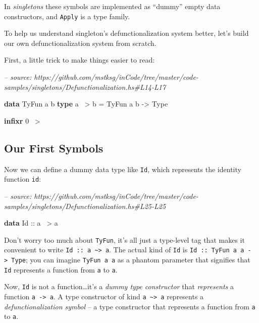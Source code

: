 \documentclass[]{article}
\newenvironment{Shaded}{}{}
\newcommand{\CommentTok}[1]{\textcolor[rgb]{0.38,0.63,0.69}{\textit{#1}}}
\newcommand{\DataTypeTok}[1]{\textcolor[rgb]{0.56,0.13,0.00}{#1}}
\newcommand{\DecValTok}[1]{\textcolor[rgb]{0.25,0.63,0.44}{#1}}
\newcommand{\FunctionTok}[1]{\textcolor[rgb]{0.02,0.16,0.49}{#1}}
\newcommand{\KeywordTok}[1]{\textcolor[rgb]{0.00,0.44,0.13}{\textbf{#1}}}
\newcommand{\NormalTok}[1]{#1}
\newcommand{\OtherTok}[1]{\textcolor[rgb]{0.00,0.44,0.13}{#1}}
\begin{document}
In \emph{singletons} these symbols are implemented as ``dummy'' empty data
constructors, and \texttt{Apply} is a type family.

To help us understand singleton's defunctionalization system better, let's build
our own defunctionalization system from scratch.

First, a little trick to make things easier to read:

\begin{Shaded}
\begin{Highlighting}[]
\CommentTok{-- source: https://github.com/mstksg/inCode/tree/master/code-samples/singletons/Defunctionalization.hs#L14-L17}

\KeywordTok{data} \DataTypeTok{TyFun}\NormalTok{ a b}
\KeywordTok{type}\NormalTok{ a }\FunctionTok{~>}\NormalTok{ b }\FunctionTok{=} \DataTypeTok{TyFun}\NormalTok{ a b }\OtherTok{->} \DataTypeTok{Type}

\KeywordTok{infixr} \DecValTok{0} \FunctionTok{~>}
\end{Highlighting}
\end{Shaded}

\hypertarget{our-first-symbols}{%
\subsection{Our First Symbols}\label{our-first-symbols}}

Now we can define a dummy data type like \texttt{Id}, which represents the
identity function \texttt{id}:

\begin{Shaded}
\begin{Highlighting}[]
\CommentTok{-- source: https://github.com/mstksg/inCode/tree/master/code-samples/singletons/Defunctionalization.hs#L25-L25}

\KeywordTok{data} \DataTypeTok{Id}\OtherTok{ ::}\NormalTok{ a }\FunctionTok{~>}\NormalTok{ a}
\end{Highlighting}
\end{Shaded}

Don't worry too much about \texttt{TyFun}, it's all just a type-level tag that
makes it convenient to write
\texttt{Id\ ::\ a\ \textasciitilde{}\textgreater{}\ a}. The actual kind of
\texttt{Id} is \texttt{Id\ ::\ TyFun\ a\ a\ -\textgreater{}\ Type}; you can
imagine \texttt{TyFun\ a\ a} as a phantom parameter that signifies that
\texttt{Id} represents a function from \texttt{a} to \texttt{a}.

Now, \texttt{Id} is not a function\ldots{}it's a \emph{dummy type constructor}
that \emph{represents} a function \texttt{a\ -\textgreater{}\ a}. A type
constructor of kind \texttt{a\ \textasciitilde{}\textgreater{}\ a} represents a
\emph{defunctionalization symbol} -- a type constructor that represents a
function from \texttt{a} to \texttt{a}.
\end{document}
